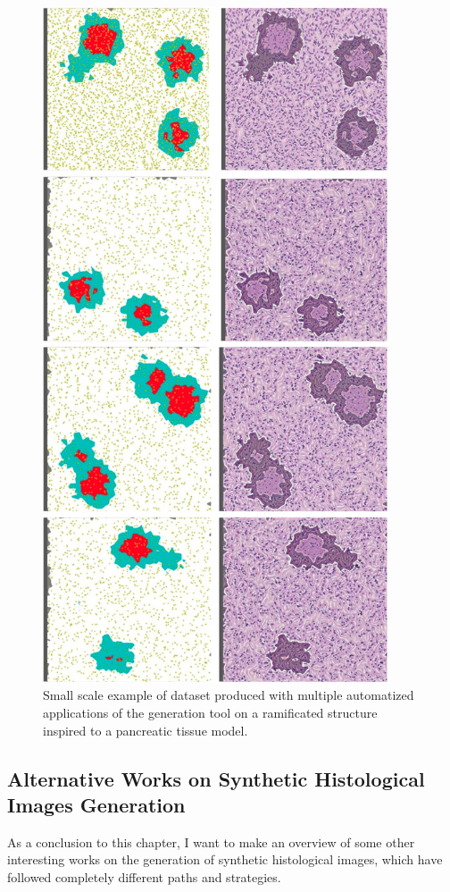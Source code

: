     \begin{figure}
        \centering
        \includegraphics[height=20cm,keepaspectratio]{images/dataset}
        \caption{Small scale example of dataset produced with multiple automatized applications of the generation tool on a ramificated structure inspired to a pancreatic tissue model.}
        \label{fig:dataset}
    \end{figure}

\subsection{Alternative Works on Synthetic Histological Images Generation}
As a conclusion to this chapter, I want to make an overview of some other interesting works on the generation of synthetic histological images, which have followed completely different paths and strategies.

